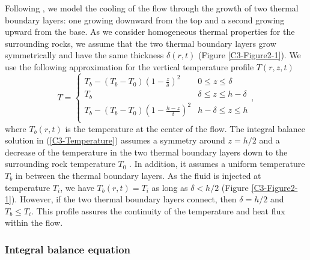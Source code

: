Following \citet{BALMFORTH:1999ey},  we model the cooling  of the flow
through  the  growth  of  two thermal  boundary  layers:  one  growing
downward from the  top and a second growing upward  from the base.  As
we consider homogeneous thermal  properties for the surrounding rocks,
we assume that the two  thermal boundary layers grow symmetrically and
have the same thickness $\delta(r,t)$ (Figure \ref{C3-Figure2-1}).  We
use the  following approximation for the  vertical temperature profile
$T(r,z,t)$
\begin{equation}
  T=
  \begin{cases}
    T_b - (T_b-T_0)(1-\frac{z}{\delta})^2 & 0 \le z\le \delta \\
    T_b & \delta \le z\le h-\delta \\
    T_b - (T_b-T_0)(1-\frac{h-z}{\delta})^2 & h-\delta \le z\le h\\
  \end{cases},
  \label{C3-Temperature}
\end{equation}
where $T_b(r,t)$  is the temperature at  the center of the  flow.  The
integral balance solution in (\ref{C3-Temperature}) assumes a symmetry
around $z=h/2$  and a decrease of  the temperature in the  two thermal
boundary  layers  down  to  the  surrounding  rock  temperature  $T_0$
\citep{BALMFORTH:1999ey}.    In  addition,   it   assumes  a   uniform
temperature  $T_b$ in  between the  thermal boundary  layers.  As  the
fluid is  injected at  temperature $T_i$, we  have $T_b(r,t)  =T_i$ as
long as $\delta<h/2$ (Figure \ref{C3-Figure2-1}).  However, if the two
thermal boundary layers connect, then $\delta = h/2$ and $T_b\le T_i$.
This profile assures  the continuity of the temperature  and heat flux
within the flow.


\subsubsection*{Integral balance equation}
\label{C3-sec:integr-balance-equat}

